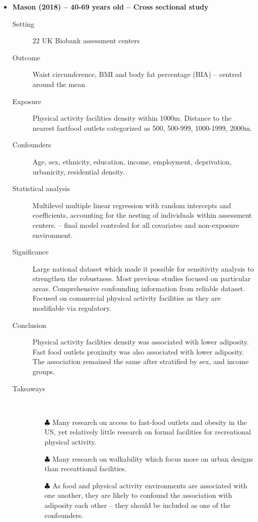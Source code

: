 \documentclass{article}
\begin{document}
\begin{itemize}
\newpage
	\item {\bf Mason (2018) -- 40-69 years old -- Cross sectional study}
		\begin{description}
			\item[Setting] 22 UK Biobank assessment centers
			\item[Outcome] Waist circumference, BMI and body fat percentage (BIA) -- centred around the mean  	
			\item[Exposure] Physical activity facilities density within 1000m. Distance to the nearest fastfood outlets categorized as 500, 500-999, 1000-1999, 2000m.
			\item[Confounders] Age, sex, ethnicity, education, income, employment, deprivation, urbanicity, residential density.
			\item[Statistical analysis] Multilevel multiple linear regression with random intercepts and coefficients, accounting for the nesting of individuals within assessment centers. -- final model controled for all covariates and non-exposure environment.
			\item[Significance] Large national dataset which 
			made it possible for sensitivity analysis to strengthen the robustness. Most previous studies focused on particular areas. Comprehensive confounding information from reliable dataset. Focused on commercial physical activity facilities as they are modifiable via regulatory.
    			\item[Conclusion] Physical activity facilities density was associated with lower adiposity. Fast food outlets proximity was also associated with lower adiposity. The association remained the same after stratified by sex, and income groups.
    			
			\item[Takeaways] \mbox{}\\ 
    				\begin{itemize}
    					\item[$\clubsuit$] Many research on access to fast-food outlets and obesity in the US, yet relatively little research on formal facilities for recreational physical activity.
    					\item[$\clubsuit$] Many research on walkability which focus more on urban designs than receattional facilities.
    					\item[$\clubsuit$] As food and physical activity environments are associated with one another, they are likely to confound the association with adiposity each other -- they should be included as one of the confounders. 
    					

\end{itemize}
\end{description}
\end{itemize}
\end{document}
